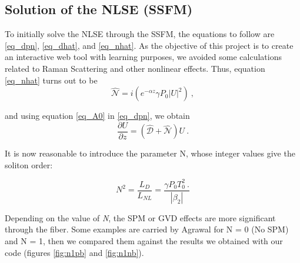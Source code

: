         \subsection{Solution of the NLSE (SSFM)}\label{subsec:nlse}
            To initially solve the NLSE through the SSFM, the equations to follow are \eqref{eq_dpn}, \eqref{eq_dhat}, and \eqref{eq_nhat}. As the objective of this project is to create an interactive web tool with learning purposes, we avoided some calculations related to Raman Scattering and other nonlinear effects. Thus, equation \eqref{eq_nhat} turns out to be 
            \begin{equation} \label{eq_nhat2}
             \hat{\mathcal{N}} = i \left( 
             e^{-\alpha z} \gamma P_0 \left|U\right|^2 
             \right) \ ,
        \end{equation}
        
        and using equation \eqref{eq_A0} in \eqref{eq_dpn}, we obtain
        \begin{equation}\label{eq_dpn2}
            \frac{\partial U}{\partial z} = \left( \hat{\mathcal{D}} + \hat{\mathcal{N}} \right) U \ . 
        \end{equation}
        
        It is now reasonable to introduce the parameter N, whose integer values give the soliton order:
        
        \begin{equation}\label{eq_n}
            N^2 = \frac{L_D}{L_{NL}} = \frac{\gamma P_0 T^2_0 \ . }{\left|\beta_2\right|}
        \end{equation}
        
        
        Depending on the value of \emph{N}, the SPM or GVD effects are more significant through the fiber. Some examples are carried by Agrawal \citep{AgrawalBook} for N = 0 (No SPM) and N = 1, then we compared them against the results we obtained with our code (figures \ref{fig:n1pb} and \ref{fig:n1nb}). 
        
